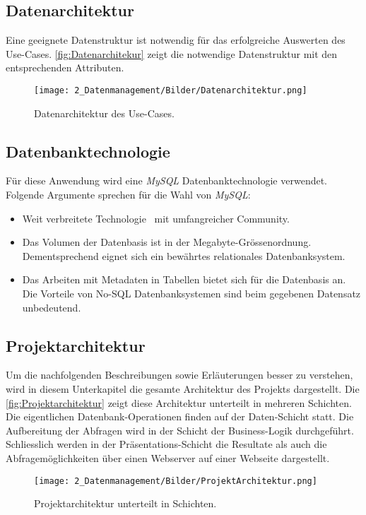 \subsection{Datenarchitektur}
Eine geeignete Datenstruktur ist notwendig für das erfolgreiche Auswerten des Use-Cases. \autoref{fig:Datenarchitekur} zeigt die notwendige Datenstruktur mit den entsprechenden Attributen. 

\begin{figure}[H]
	\centering
	\texttt{[image: 2\_Datenmanagement/Bilder/Datenarchitektur.png]}
	\caption{Datenarchitektur des Use-Cases.}
	\label{fig:Datenarchitekur}
\end{figure}

\subsection{Datenbanktechnologie}

Für diese Anwendung wird eine \textit{MySQL} Datenbanktechnologie verwendet. Folgende Argumente sprechen für die Wahl von \textit{MySQL}:
\begin{itemize}
	\item Weit verbreitete Technologie~\cite{db-engines.com} mit umfangreicher Community.
	\item Das Volumen der Datenbasis ist in der Megabyte-Grössenordnung. Dementsprechend eignet sich ein bewährtes relationales Datenbanksystem.
	\item Das Arbeiten mit Metadaten in Tabellen bietet sich für die Datenbasis an. Die Vorteile von No-SQL Datenbanksystemen sind beim gegebenen Datensatz unbedeutend.
\end{itemize}

\subsection{Projektarchitektur}
Um die nachfolgenden Beschreibungen sowie Erläuterungen besser zu verstehen, wird in diesem Unterkapitel die gesamte Architektur des Projekts dargestellt. Die \autoref{fig:Projektarchitektur} zeigt diese Architektur unterteilt in mehreren Schichten. Die eigentlichen Datenbank-Operationen finden auf der Daten-Schicht statt. Die Aufbereitung der Abfragen wird in der Schicht der Business-Logik durchgeführt. Schliesslich werden in der Präsentations-Schicht die Resultate als auch die Abfragemöglichkeiten über einen Webserver auf einer Webseite dargestellt.

\begin{figure}[H]
	\centering
	\texttt{[image: 2\_Datenmanagement/Bilder/ProjektArchitektur.png]}
	\caption{Projektarchitektur unterteilt in Schichten.}
	\label{fig:Projektarchitektur}
\end{figure}